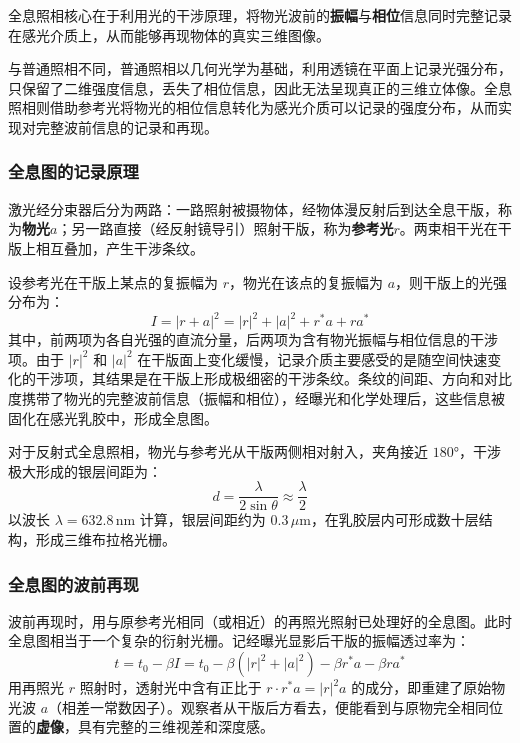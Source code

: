 \documentclass[dvipsnames, svgnames,a4paper,11pt]{article}
\begin{document}
全息照相核心在于利用光的干涉原理，将物光波前的\textbf{振幅}与\textbf{相位}信息同时完整记录在感光介质上，从而能够再现物体的真实三维图像。

与普通照相不同，普通照相以几何光学为基础，利用透镜在平面上记录光强分布，只保留了二维强度信息，丢失了相位信息，因此无法呈现真正的三维立体像。全息照相则借助参考光将物光的相位信息转化为感光介质可以记录的强度分布，从而实现对完整波前信息的记录和再现。

\subsubsection{全息图的记录原理}

激光经分束器后分为两路：一路照射被摄物体，经物体漫反射后到达全息干版，称为\textbf{物光}$a$；另一路直接（经反射镜导引）照射干版，称为\textbf{参考光}$r$。两束相干光在干版上相互叠加，产生干涉条纹。

设参考光在干版上某点的复振幅为 $r$，物光在该点的复振幅为 $a$，则干版上的光强分布为：
\begin{equation}
	I = |r + a|^2 = |r|^2 + |a|^2 + r^* a + r a^*
\end{equation}
其中，前两项为各自光强的直流分量，后两项为含有物光振幅与相位信息的干涉项。由于 $|r|^2$ 和 $|a|^2$ 在干版面上变化缓慢，记录介质主要感受的是随空间快速变化的干涉项，其结果是在干版上形成极细密的干涉条纹。条纹的间距、方向和对比度携带了物光的完整波前信息（振幅和相位），经曝光和化学处理后，这些信息被固化在感光乳胶中，形成全息图。

对于反射式全息照相，物光与参考光从干版两侧相对射入，夹角接近 $180°$，干涉极大形成的银层间距为：
\begin{equation}
	d = \frac{\lambda}{2\sin\theta} \approx \frac{\lambda}{2}
\end{equation}
以波长 $\lambda = 632.8\,\text{nm}$ 计算，银层间距约为 $0.3\,\mu\text{m}$，在乳胶层内可形成数十层结构，形成三维布拉格光栅。

\subsubsection{全息图的波前再现}

波前再现时，用与原参考光相同（或相近）的再照光照射已处理好的全息图。此时全息图相当于一个复杂的衍射光栅。记经曝光显影后干版的振幅透过率为：
\begin{equation}
	t = t_0 - \beta I = t_0 - \beta(|r|^2 + |a|^2) - \beta r^* a - \beta r a^*
\end{equation}
用再照光 $r$ 照射时，透射光中含有正比于 $r \cdot r^* a = |r|^2 a$ 的成分，即重建了原始物光波 $a$（相差一常数因子）。观察者从干版后方看去，便能看到与原物完全相同位置的\textbf{虚像}，具有完整的三维视差和深度感。
\end{document}
